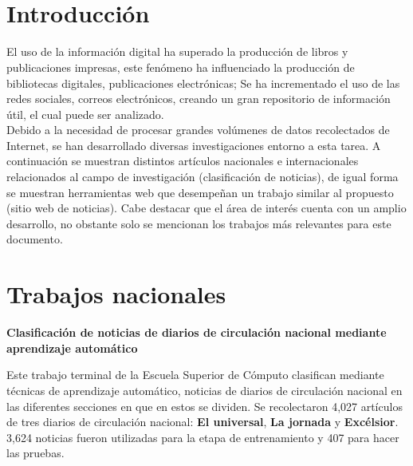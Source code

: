 
\ \\\\
\section{Introducción}


El uso de la información digital ha superado la producción de libros y publicaciones impresas, este fenómeno ha influenciado la producción de bibliotecas digitales, publicaciones electrónicas; Se ha incrementado el uso de las redes sociales, correos electrónicos, creando un gran repositorio de información útil, el cual puede ser analizado\citep{CD1}.\\

Debido a la necesidad de procesar grandes volúmenes de datos recolectados de Internet, se han desarrollado diversas investigaciones entorno a esta tarea. A continuación se muestran distintos artículos nacionales e internacionales relacionados al campo de investigación (clasificación de noticias), de igual forma se muestran herramientas web que desempeñan un trabajo similar al propuesto (sitio web de noticias). Cabe destacar que el área de interés cuenta con un amplio desarrollo, no obstante solo se mencionan los trabajos más relevantes para este documento.


\section{Trabajos nacionales}


\begin{large}
	 \textbf{Clasificación de noticias de diarios de circulación nacional mediante aprendizaje automático }\\
\end{large}


Este trabajo terminal de la Escuela Superior de Cómputo \citep{CD2} clasifican mediante técnicas de aprendizaje automático, noticias de diarios de circulación nacional en las diferentes secciones en que en estos se dividen. Se recolectaron 4,027 artículos de tres diarios de circulación nacional: \textbf{El universal}, \textbf{La jornada} y \textbf{Excélsior}. 3,624 noticias fueron utilizadas para la etapa de entrenamiento y 407 para hacer las pruebas.\\

